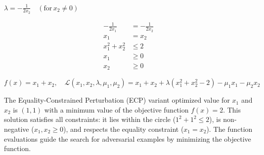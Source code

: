 $\lambda = -\frac{1}{2x_2} \quad (\text{for} \, x_2 \neq 0)$

\begin{align*}
-\frac{1}{2x_1} & = -\frac{1}{2x_2}\\
x_1 & = x_2\\
x_1^2 + x_2^2 & \leq 2\\
x_1 & \geq 0\\
x_2 & \geq 0
\end{align*}

$f(x) = x_1 + x_2, \quad \mathcal{L}(x_1, x_2, \lambda, \mu_1, \mu_2) = x_1 + x_2 + \lambda (x_1^2 + x_2^2 - 2) - \mu_1 x_1 - \mu_2 x_2$

The Equality-Constrained Perturbation (ECP) variant optimized value for $x_1$ and $x_2$ is $(1, 1)$ with a minimum value of the objective function $f(x) = 2$. This solution satisfies all constraints: it lies within the circle ($1^2 + 1^2 \leq 2$), is non-negative ($x_1, x_2 \geq 0$), and respects the equality constraint ($x_1 = x_2$). The function evaluations guide the search for adversarial examples by minimizing the objective function.